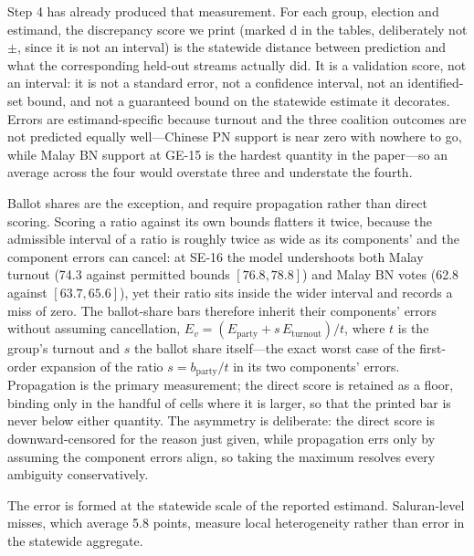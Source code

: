 \documentclass[11pt]{article}
\begin{document}
Step 4 has already produced that measurement. For each group, election and estimand, the discrepancy score we print (marked \textsf{d} in the tables, deliberately not $\pm$, since it is not an interval) is the statewide distance between prediction and what the corresponding held-out streams actually did. It is a validation score, not an interval: it is not a standard error, not a confidence interval, not an identified-set bound, and not a guaranteed bound on the statewide estimate it decorates. Errors are estimand-specific because turnout and the three coalition outcomes are not predicted equally well---Chinese PN support is near zero with nowhere to go, while Malay BN support at GE-15 is the hardest quantity in the paper---so an average across the four would overstate three and understate the fourth.

Ballot shares are the exception, and require propagation rather than direct scoring. Scoring a ratio against its own bounds flatters it twice, because the admissible interval of a ratio is roughly twice as wide as its components' and the component errors can cancel: at SE-16 the model undershoots both Malay turnout (74.3 against permitted bounds $[76.8, 78.8]$) and Malay BN votes (62.8 against $[63.7, 65.6]$), yet their ratio sits inside the wider interval and records a miss of zero. The ballot-share bars therefore inherit their components' errors without assuming cancellation, $E_v = (E_{\text{party}} + s\,E_{\text{turnout}})/t$, where $t$ is the group's turnout and $s$ the ballot share itself---the exact worst case of the first-order expansion of the ratio $s = b_{\text{party}}/t$ in its two components' errors. Propagation is the primary measurement; the direct score is retained as a floor, binding only in the handful of cells where it is larger, so that the printed bar is never below either quantity. The asymmetry is deliberate: the direct score is downward-censored for the reason just given, while propagation errs only by assuming the component errors align, so taking the maximum resolves every ambiguity conservatively.

The error is formed at the statewide scale of the reported estimand. Saluran-level misses, which average 5.8 points, measure local heterogeneity rather than error in the statewide aggregate.
\end{document}
